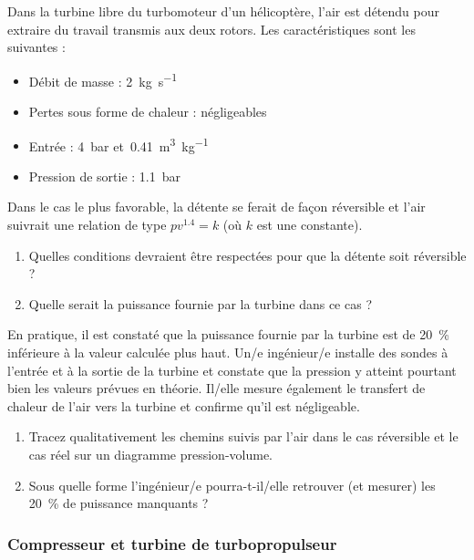 	Dans la turbine libre du turbomoteur d’un hélicoptère, l’air est détendu pour extraire du travail transmis aux deux rotors. Les caractéristiques sont les suivantes :
	
	\begin{itemize}
		\item Débit de masse : 		\tab \SI{2}{\kilogram\per\second}
		\item Pertes sous forme de chaleur : négligeables
		\item Entrée :  				\tab \SI{4}{\bar} et~\SI{0,41}{\metre\cubed\per\kilogram}
		\item Pression de sortie : \tab \SI{1,1}{\bar}
	\end{itemize}
	
	Dans le cas le plus favorable, la détente se ferait de façon réversible et l’air suivrait une relation de type $p v^{\num{1,4}} = k$ (où $k$ est une constante).
	
	\begin{enumerate}
		\item Quelles conditions devraient être respectées pour que la détente soit réversible ?
		\item Quelle serait la puissance fournie par la turbine dans ce cas ?
	\end{enumerate}
	
	En pratique, il est constaté que la puissance fournie par la turbine est de \SI{20}{\percent} inférieure à la valeur calculée plus haut. Un/e ingénieur/e installe des sondes à l’entrée et à la sortie de la turbine et constate que la pression y atteint pourtant bien les valeurs prévues en théorie. Il/elle mesure également le transfert de chaleur de l’air vers la turbine et confirme qu’il est négligeable.
	
	\begin{enumerate}
		\item Tracez qualitativement les chemins suivis par l’air dans le cas réversible et le cas réel sur un diagramme pression-volume.
		\item Sous quelle forme l’ingénieur/e pourra-t-il/elle retrouver (et mesurer) les \SI{20}{\percent} de puissance manquants ?
	\end{enumerate}


	
\subsubsection{Compresseur et turbine de turbopropulseur}
\label{exo_compresseur_turbine_turbopropulseur}

